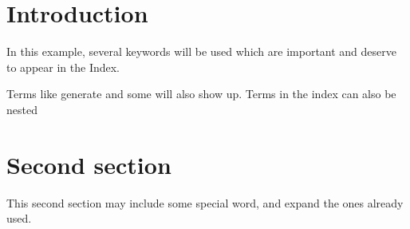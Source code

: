 \documentclass{article}
\begin{document}
	\section{Introduction}
	In this example, several keywords will be used which 
	are important and deserve to appear in the Index.
	
	Terms like generate and some will also 
	show up. Terms in the index can also be nested 
	
	\clearpage
	
	\section{Second section}
	This second section may include some special word, 
	and expand the ones already used.
	
	\printindex
\end{document}
